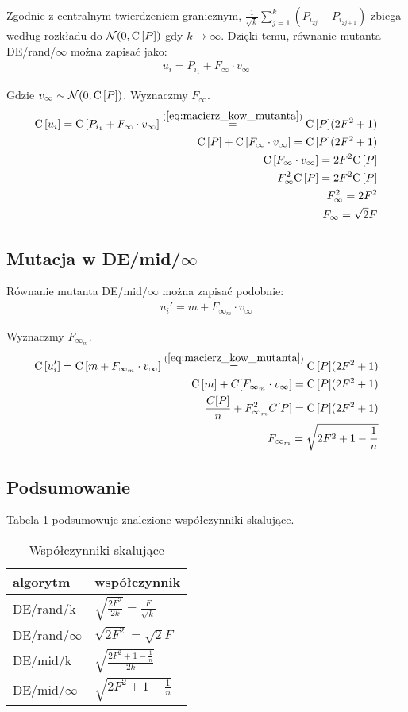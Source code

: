 Zgodnie z centralnym twierdzeniem granicznym, $\frac{1}{{\sqrt{k}}}\sum\limits_{j=1}^k (P_{i_{2j}} - P_{i_{2j+1}})$ 
zbiega według rozkładu do $\mathcal{N}(0, {\rm C}\,[P])$ gdy $k \to \infty$. 
Dzięki temu, równanie mutanta DE/rand/$\infty$ można zapisać jako:
\begin{align*}
u_i = P_{i_1} + F_\infty \cdot v_\infty
\end{align*}

Gdzie $v_\infty \sim \mathcal{N}(0, {\rm C}\,[P])$. Wyznaczmy $F_\infty$.
\begin{align*}
{\rm C}\,[u_i] = {\rm C}\,[P_{i_1} + F_\infty \cdot v_\infty] \overset{(\ref{eq:macierz_kow_mutanta})}{=} {\rm C}\,[P](2F^2 + 1) \\
{\rm C}\,[P] + {\rm C}\,[F_\infty \cdot v_\infty] = {\rm C}\,[P](2F^2 + 1) \\
{\rm C}\,[F_\infty \cdot v_\infty] = 2F^2{\rm C}\,[P] \\
F_\infty^2 {\rm C}\,[P] = 2F^2{\rm C}\,[P] \\
F_\infty^2 = 2F^2 \\
F_\infty = \sqrt{2}F
\end{align*}

\subsection{Mutacja w DE/mid/$\infty$}

Równanie mutanta DE/mid/$\infty$ można zapisać podobnie:
\begin{align*}
u_i' = m + F_{\infty_m} \cdot v_\infty
\end{align*}

Wyznaczmy $F_{\infty_m}$.
\begin{align*}
{\rm C}\,[u_i'] = {\rm C}\,[m + F_{\infty_m} \cdot v_\infty] \overset{(\ref{eq:macierz_kow_mutanta})}{=} {\rm C}\,[P](2F^2 + 1) \\
{\rm C}\,[m] + C[F_{\infty_m} \cdot v_\infty] = {\rm C}\,[P](2F^2 + 1) \\
\frac{C[P]}{n} + F_{\infty_m}^2 C[P] = {\rm C}\,[P](2F^2 + 1) \\
F_{\infty_m} = \sqrt{2F^2 + 1 - \frac{1}{n}}
\end{align*}

\subsection{Podsumowanie}

Tabela \ref{table:parametry} podsumowuje znalezione współczynniki skalujące.

\begin{table}[H]
\centering
\begin{tabular}{ l | l }
algorytm         & współczynnik \\ \hline
DE/rand/k        & $\sqrt{\frac{2F^2}{2k}} = \frac{F}{\sqrt{k}}$ \\ 
DE/rand/$\infty$ & $\sqrt{2F^2} = \sqrt{2}F$ \\ \hline
DE/mid/k         & $\sqrt{\frac{2F^2 + 1 - \frac{1}{n}}{2k}}$ \\
DE/mid/$\infty$  & $\sqrt{2F^2 + 1 - \frac{1}{n}}$ \\
\end{tabular}
\caption{Współczynniki skalujące}
\label{table:parametry}
\end{table}


